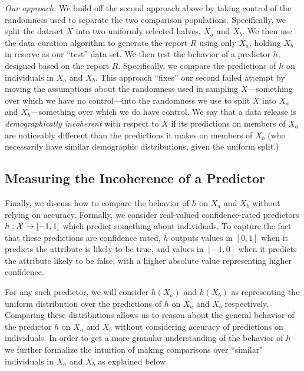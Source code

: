 \noindent
\emph{Our approach.} We build off the second approach above by taking control of the randomness used to separate the two comparison populations.  Specifically, we split the dataset $X$ into two uniformly selected halves, $X_a$ and $X_b$. We then use the data curation algorithm to generate the report $R$ using only $X_a$, holding $X_b$ in reserve as our ``test'' data set. We then test the behavior of a predictor $h$, designed based on the report $R$. Specifically, we compare the predictions of $h$ on individuals in $X_a$ and $X_b$. This approach ``fixes'' our second failed attempt by moving the assumptions about the randomness used in sampling $X$---something over which we have no control---into the randomness we use to split $X$ into $X_a$ and $X_b$---something over which we do have control. We say that a data release is \emph{demographically incoherent} with respect to $X$ if its predictions on members of  $X_a$ are noticeably different than the predictions it makes on members of $X_b$ (who necessarily have similar demographic distributions, given the uniform split.) 

\subsection{Measuring the Incoherence of a Predictor}

Finally, we discuss how to compare the behavior of $h$ on $X_a$ and $X_b$ without relying on accuracy.
Formally, we consider real-valued confidence-rated predictors $h: \mathcal{X} \to [-1,1]$ which predict something about individuals. To capture the fact that these predictions are confidence rated, $h$ outputs values in $[0,1]$ when it predicts the attribute is likely to be true, and values in $[-1,0]$ when it predicts the attribute likely to be false, with a higher absolute value representing higher confidence.  

For any such predictor, we will consider $h(X_a)$ and $h(X_b)$ as representing the uniform distribution over the predictions of $h$ on $X_a$ and $X_b$ respectively. Comparing these distributions allows us to reason about the general behavior of the predictor $h$ on $X_a$ and $X_b$ without considering accuracy of predictions on individuals.
In order to get a more granular understanding of the behavior of $h$ we further formalize the intuition of making  comparisons over ``similar" individuals in $X_a$ and $X_b$ as explained below.

